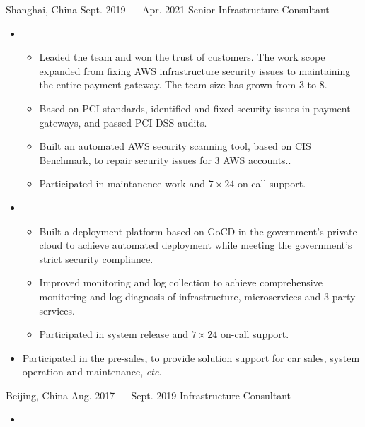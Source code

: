 \documentclass{resume}
\begin{document}
\begin{body}
	{Shanghai, China}
	{Sept. 2019 --- Apr. 2021}
	{Senior Infrastructure Consultant}
	\begin{itemize}[noitemsep,topsep=0pt]
		\item {}
		\begin{itemize}[noitemsep,topsep=0pt]
			\item Leaded the team and won the trust of customers. The work scope expanded from fixing AWS infrastructure security issues to maintaining the entire payment gateway. The team size has grown from 3 to 8.
			\item Based on PCI standards, identified and fixed security issues in payment gateways, and passed PCI DSS audits.
			\item Built an automated AWS security scanning tool, based on CIS Benchmark, to repair security issues for 3 AWS accounts..
			\item Participated in maintanence work and $7\times 24$ on-call support.
		\end{itemize}
		\item {}
		\begin{itemize}[noitemsep,topsep=0pt]
			\item Built a deployment platform based on GoCD in the government's private cloud to achieve automated deployment while meeting the government's strict security compliance.
			\item Improved monitoring and log collection to achieve comprehensive monitoring and log diagnosis of infrastructure, microservices and 3-party services.
			\item Participated in system release and $7\times 24$ on-call support.
		\end{itemize}
		\item Participated in the pre-sales, to provide solution support for car sales, system operation and maintenance, \textit{etc}.
	\end{itemize}
	{Beijing, China}
	{Aug. 2017 --- Sept. 2019}
	{Infrastructure Consultant}
	\begin{itemize}[noitemsep,topsep=0pt]
		\item {}
		\begin{itemize}[noitemsep,topsep=0pt]

\end{itemize}
\end{itemize}
\end{body}
\end{document}

